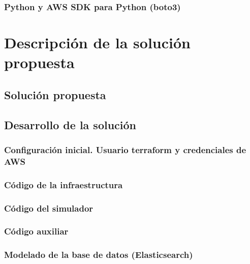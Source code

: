\documentclass[12pt]{article}
\begin{document}
\subsubsection{Python y AWS SDK para Python (boto3)}


\section{Descripción de la solución propuesta}

\subsection{Solución propuesta}



\subsection{Desarrollo de la solución}
\subsubsection{Configuración inicial. Usuario terraform y credenciales de AWS}


\subsubsection{Código de la infraestructura}


\subsubsection{Código del simulador}


\subsubsection{Código auxiliar}


\subsubsection{Modelado de la base de datos (Elasticsearch)}

\end{document}
